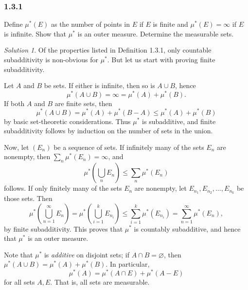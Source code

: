 \documentclass{report}
\theoremstyle{remark}
\newtheorem*{solution}{Solution}
\begin{document}
\subsubsection*{1.3.1}
Define $\mu^*(E)$ as the number of points in $E$ if $E$ is finite and $\mu^*(E) = \infty$ if $E$ is infinite. Show that $\mu^*$ is an outer measure. Determine the measurable sets.

\begin{solution}
  Of the properties listed in Definition 1.3.1, only countable subadditivity is non-obvious for $\mu^*$. But let us start with proving finite subadditivity.

  Let $A$ and $B$ be sets. If either is infinite, then so is $A \cup B$, hence
  \begin{equation*}
    \mu^*(A \cup B) = \infty = \mu^*(A) + \mu^*(B).
  \end{equation*}
  If both $A$ and $B$ are finite sets, then
  \begin{equation*}
    \mu^*(A \cup B) = \mu^*(A) + \mu^*(B - A) \le \mu^*(A) + \mu^*(B)
  \end{equation*}
  by basic set-theoretic considerations. Thus $\mu^*$ is subadditive, and finite subadditivity follows by induction on the number of sets in the union.

  Now, let $(E_n)$ be a sequence of sets. If infinitely many of the sets $E_n$ are nonempty, then $\sum_n \mu^*(E_n) = \infty$, and
  \begin{equation*}
    \mu^*\left( \bigcup_n E_n \right) \le \sum_n \mu^*(E_n)
  \end{equation*}
  follows. If only finitely many of the sets $E_n$ are nonempty, let $E_{n_1}, E_{n_2}, \dots, E_{n_k}$ be those sets. Then
  \begin{equation*}
    \mu^*\left( \bigcup_{n=1}^\infty E_n \right) = \mu^*\left( \bigcup_{i=1}^k E_{n_i} \right) \le \sum_{i=1}^k \mu^*(E_{n_i}) = \sum_{n=1}^\infty \mu^*(E_n),
  \end{equation*}
  by finite subadditivity. This proves that $\mu^*$ is countably subadditive, and hence that $\mu^*$ is an outer measure.

  Note that $\mu^*$ is \emph{additive} on disjoint sets; if $A \cap B = \varnothing$, then $\mu^*(A \cup B) = \mu^*(A) + \mu^*(B)$. In particular,
  \begin{equation*}
    \mu^*(A) = \mu^*(A \cap E) + \mu^*(A - E)
  \end{equation*}
  for all sets $A, E$. That is, all sets are measurable.
\end{solution}
\end{document}
